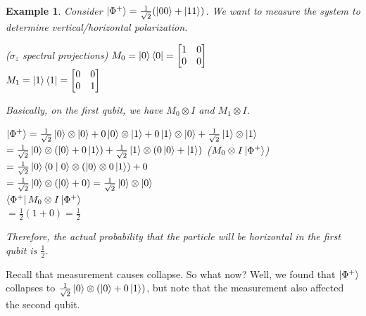 \documentclass[12pt]{article}
\theoremstyle{plain}
\theoremstyle{nonumberplain}
\theoremstyle{plain}
\newtheorem{example}[lemma]{Example}
\theoremstyle{nonumberplain}
\newcommand\1{{\bf 1}}
\newcommand{\bmat}[1]{\begin{bmatrix*} #1 \end{bmatrix*}} %
\newcommand{\<}{\left\langle}
\renewcommand{\>}{\right\rangle}
\newcommand{\inp}[2]{\left\langle#1\mid #2\right\rangle} %
\begin{document}
\begin{example}
Consider $\ket{\Phi^+}=\frac{1}{\sqrt{2}}(\ket{00}+\ket{11})$. We want to measure the system to determine vertical/horizontal polarization.
\begin{center}
($\sigma_z$ spectral projections)
$M_0=\ket{0}\bra{0}=\bmat{1 & 0 \\ 0 & 0}$\\
$M_1=\ket{1}\bra{1}=\bmat{0 & 0 \\ 0 & 1}$
\end{center}
Basically, on the first qubit, we have $M_0\otimes I$ and $M_1\otimes I$.
\begin{center}
$\ket{\Phi^+}=\frac{1}{\sqrt{2}}\ket{0}\otimes\ket{0}+0\ket{0}\otimes\ket{1}+0\ket{1}\otimes\ket{0}+\frac{1}{\sqrt{2}}\ket{1}\otimes\ket{1}$\\
$=\frac{1}{\sqrt{2}}\ket{0}\otimes(\ket{0}+0\ket{1})+\frac{1}{\sqrt{2}}\ket{1}\otimes(0\ket{0}+\ket{1})$
($M_0\otimes I\ket{\Phi^+}$)\\
$=\frac{1}{\sqrt{2}}\ket{0}\inp{0}{0}\otimes (\ket{0}\otimes 0\ket{1})+0$\\
$=\frac{1}{\sqrt{2}}\ket{0}\otimes (\ket{0}+0)=\frac{1}{\sqrt{2}}\ket{0}\otimes \ket{0}$\\
$\bra{\Phi^+}M_0\otimes I\ket{\Phi^+}$\\
$=\frac{1}{2}(1+0)=\frac{1}{2}$
\end{center}
Therefore, the actual probability that the particle will be horizontal in the first qubit is $\frac{1}{2}$.
\end{example}
Recall that measurement causes collapse. So what now? Well, we found that $\ket{\Phi^+}$ collapses to $\frac{1}{\sqrt{2}}\ket{0}\otimes (\ket{0}+0\ket{1})$, but note that the measurement also affected the second qubit.

\end{document}
